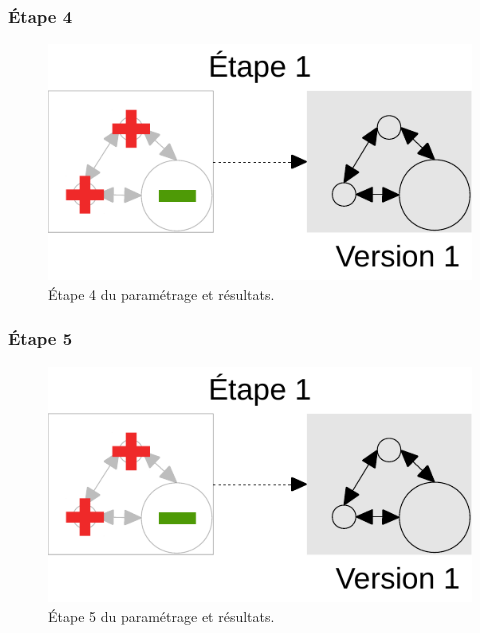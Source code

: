 \documentclass[12pt, a4paper, oneside]{book}
\begin{document}
	\subsubsection{Étape 4}
		\begin{figure}[H]
			\centering
			\includegraphics[width = \linewidth, page = 4]{img/schemas_etapes_individuelles.pdf}
			\caption{Étape 4 du paramétrage et résultats.}
		\end{figure}

\pagebreak
	\subsubsection{Étape 5}
		\begin{figure}[H]
			\centering
			\includegraphics[width = \linewidth, page = 5]{img/schemas_etapes_individuelles.pdf}
			\caption{Étape 5 du paramétrage et résultats.}
		\end{figure}

\pagebreak
\end{document}
